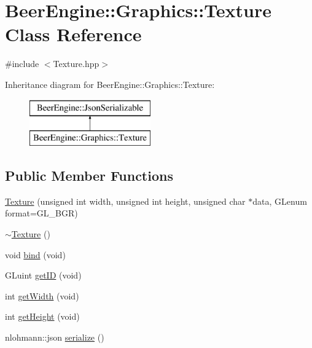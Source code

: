 \hypertarget{class_beer_engine_1_1_graphics_1_1_texture}{}\section{Beer\+Engine\+:\+:Graphics\+:\+:Texture Class Reference}
\label{class_beer_engine_1_1_graphics_1_1_texture}


{\ttfamily \#include $<$Texture.\+hpp$>$}

Inheritance diagram for Beer\+Engine\+:\+:Graphics\+:\+:Texture\+:\begin{figure}[H]
\begin{center}
\leavevmode
\includegraphics[height=2.000000cm]{class_beer_engine_1_1_graphics_1_1_texture}
\end{center}
\end{figure}
\subsection*{Public Member Functions}
\begin{DoxyCompactItemize}
\item 
\mbox{\hyperlink{class_beer_engine_1_1_graphics_1_1_texture_a1cb1dc8dea72805bec4fcbb150417c7f}{Texture}} (unsigned int width, unsigned int height, unsigned char $\ast$data, G\+Lenum format=G\+L\+\_\+\+B\+GR)
\item 
\mbox{\hyperlink{class_beer_engine_1_1_graphics_1_1_texture_aed43390619f1c87396b0155b5b093435}{$\sim$\+Texture}} ()
\item 
void \mbox{\hyperlink{class_beer_engine_1_1_graphics_1_1_texture_ae3d406ddddec85670df1e98d776353bf}{bind}} (void)
\item 
G\+Luint \mbox{\hyperlink{class_beer_engine_1_1_graphics_1_1_texture_abfa392e4a23ad309225526af572f9751}{get\+ID}} (void)
\item 
int \mbox{\hyperlink{class_beer_engine_1_1_graphics_1_1_texture_a1586064c91fdcf29b539a2fedd8f63ca}{get\+Width}} (void)
\item 
int \mbox{\hyperlink{class_beer_engine_1_1_graphics_1_1_texture_a961146ab713ba8fd18f8db95a97145ca}{get\+Height}} (void)
\item 
nlohmann\+::json \mbox{\hyperlink{class_beer_engine_1_1_graphics_1_1_texture_acb81c7ded6c7be42b0e901dd57dc8785}{serialize}} ()
\end{DoxyCompactItemize}
